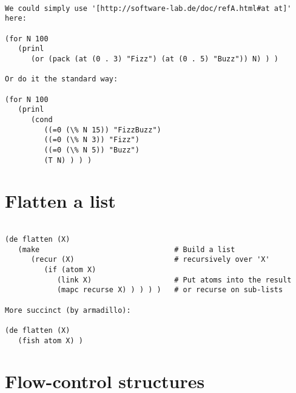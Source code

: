 \begin{verbatim}

We could simply use '[http://software-lab.de/doc/refA.html#at at]' here:

(for N 100
   (prinl
      (or (pack (at (0 . 3) "Fizz") (at (0 . 5) "Buzz")) N) ) )

Or do it the standard way:

(for N 100
   (prinl
      (cond
         ((=0 (\% N 15)) "FizzBuzz")
         ((=0 (\% N 3)) "Fizz")
         ((=0 (\% N 5)) "Buzz")
         (T N) ) ) )

\end{verbatim}

\section*{Flatten a list}

\begin{verbatim}

(de flatten (X)
   (make                               # Build a list
      (recur (X)                       # recursively over 'X'
         (if (atom X)
            (link X)                   # Put atoms into the result
            (mapc recurse X) ) ) ) )   # or recurse on sub-lists

More succinct (by armadillo):

(de flatten (X)
   (fish atom X) )

\end{verbatim}

\section*{Flow-control structures}

